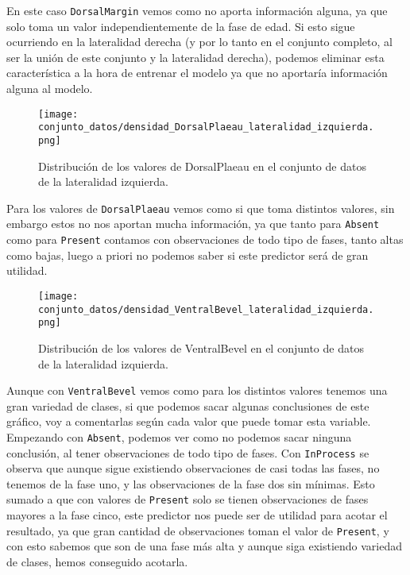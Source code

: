 En este caso \texttt{DorsalMargin} vemos como no aporta información alguna, ya que solo toma un valor independientemente de la fase de edad. Si esto sigue ocurriendo en la lateralidad derecha (y por lo tanto en el conjunto completo, al ser la unión de este conjunto y la lateralidad derecha), podemos eliminar esta característica a la hora de entrenar el modelo ya que no aportaría información alguna al modelo.

\begin{figure}[H]
	\centering
	\texttt{[image: conjunto\_datos/densidad\_DorsalPlaeau\_lateralidad\_izquierda.png]}
	\caption{Distribución de los valores de DorsalPlaeau en el conjunto de datos de la lateralidad izquierda.}
	\label{fig:densidad_DorsalPlaeau_izquierda}
\end{figure}

Para los valores de \texttt{DorsalPlaeau} vemos como si que toma distintos valores, sin embargo estos no nos aportan mucha información, ya que tanto para \texttt{Absent} como para \texttt{Present} contamos con observaciones de todo tipo de fases, tanto altas como bajas, luego a priori no podemos saber si este predictor será de gran utilidad.

\begin{figure}[H]
	\centering
	\texttt{[image: conjunto\_datos/densidad\_VentralBevel\_lateralidad\_izquierda.png]}
	\caption{Distribución de los valores de VentralBevel en el conjunto de datos de la lateralidad izquierda.}
	\label{fig:densidad_VentralBevel_izquierda}
\end{figure}

Aunque con \texttt{VentralBevel} vemos como para los distintos valores tenemos una gran variedad de clases, si que podemos sacar algunas conclusiones de este gráfico, voy a comentarlas según cada valor que puede tomar esta variable. Empezando con \texttt{Absent}, podemos ver como no podemos sacar ninguna conclusión, al tener observaciones de todo tipo de fases. Con \texttt{InProcess} se observa que aunque sigue existiendo observaciones de casi todas las fases, no tenemos de la fase uno, y las observaciones de la fase dos sin mínimas. Esto sumado a que con valores de \texttt{Present} solo se tienen observaciones de fases mayores a la fase cinco, este predictor nos puede ser de utilidad para acotar el resultado, ya que gran cantidad de observaciones toman el valor de \texttt{Present}, y con esto sabemos que son de una fase más alta y aunque siga existiendo variedad de clases, hemos conseguido acotarla.



